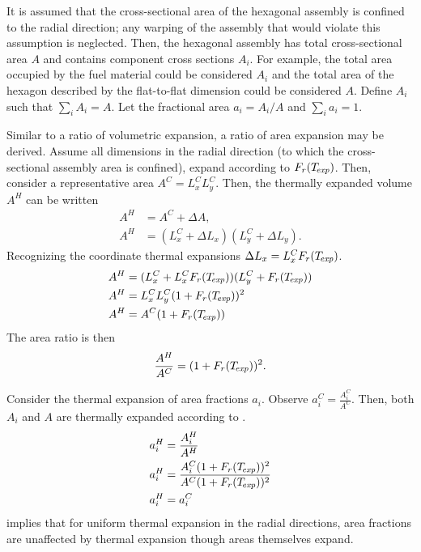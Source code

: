     It is assumed that the cross-sectional area of the hexagonal assembly is 
    confined to the radial direction; any warping of the assembly that would
    violate this assumption is neglected. Then, the hexagonal assembly has total
    cross-sectional area $A$ and contains component cross sections $A_i$. For
    example, the total area occupied by the fuel material could be considered
    $A_i$ and the total area of the hexagon described by the flat-to-flat
    dimension could be considered $A$. Define $A_i$ such that 
    $\sum_{i} A_i = A$. Let the fractional area $a_i = A_i/A$ and 
    $\sum_{i} a_i = 1$.

    Similar to a ratio of volumetric expansion, a ratio of area expansion may be
    derived. Assume all dimensions in the radial direction (to which the
    cross-sectional assembly area is confined), expand according to
    $F_r(T_{\!\mbox{\scriptsize \em exp}})$. Then, consider a representative area $A^C = L_x^C L_y^C$.
    Then, the thermally expanded volume $A^H$ can be written
    \begin{align}
      A^H &= A^C + \Delta A, \\
      A^H &= (L_x^C + \Delta L_x) (L_y^C + \Delta L_y).
    \end{align}
    Recognizing the coordinate thermal expansions ${\Delta L_x = L_x^C
    F_r(T_{\!\mbox{\scriptsize \em exp}})}$.
    \begin{align}
      A^H &= (L_x^C + L_x^C F_r(T_{\!\mbox{\scriptsize \em exp}})) (L_y^C + F_r(T_{\!\mbox{\scriptsize \em exp}})) \\
      A^H &= L_x^C L_y^C (1 + F_r(T_{\!\mbox{\scriptsize \em exp}}))^2 \\
      A^H &= A^C (1 + F_r(T_{\!\mbox{\scriptsize \em exp}}))
    \end{align}
    The area ratio is then
    \begin{equation}
      \label{eq:area_ratio}
      \frac{A^H}{A^C} = (1 + F_r(T_{\!\mbox{\scriptsize \em exp}}))^2.
    \end{equation}

    Consider the thermal expansion of area fractions $a_i$. Observe $a_i^C =
    \frac{A_i^C}{A^C}$. Then, both $A_i$ and $A$ are thermally expanded 
    according to .
    \begin{align}
      a_i^H &= \frac{A_i^H}{A^H} \\
      a_i^H &= \frac{A_i^C (1 + F_r(T_{\!\mbox{\scriptsize \em exp}}))^2}{A^C (1 + F_r(T_{\!\mbox{\scriptsize \em exp}}))^2} \\
      \label{eq:constant_area_frac}
      a_i^H &= a_i^C
    \end{align}
     implies that for uniform thermal expansion in 
    the radial directions, area fractions are unaffected by thermal expansion 
    though areas themselves expand. 
    
